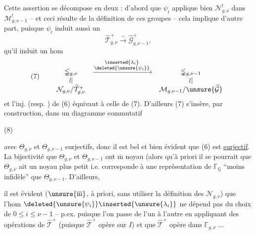 Cette assertion se décompose en deux :  d'abord que $\psi_i$ applique bien $\mathcal N_{g,\nu}^{!}$ dans $\mathcal M_{g,\nu-1}^{!}$ -- et ceci résulte de la définition  de ces groupes -- cela implique d'autre part, puisque $\psi_i$ induit aussi un  
\[
\widehat{\mathcal T}_{g,\nu}^{+}
\xrightarrow{\sim}
\widehat{\mathcal G}_{g,\nu-1}^{+},
\]
qu'il induit un hom
\[
(7)\qquad
\begin{array}{ccc}
\mathbb{\Gamma}_{g,\nu}
&\xrightarrow{\substack{\inserted{\lambda_i}\\\deleted{\unsure{\psi_i}}}}&
\mathbb{\Gamma}_{g,\nu-1}\\
\wr\vert&&\wr\vert\\
\mathcal N_{g,\nu}/\widehat{\mathcal T}_{g,\nu}^{+}
&&\mathcal M_{g,\nu-1}/\unsure{\widehat{\mathcal G}}
\end{array}
\]
et l'inj. (resp. ) de (6) équivaut à celle de (7). D'ailleurs (7) s'insère, par construction, dans un diagramme commutatif

\begin{samepage}
(8)\quad{}
\end{samepage}

avec $\Theta_{g,\nu}$ et $\Theta_{g,\nu-1}$ surjectifs, donc il est bel et bien évident que (6) est \uline{surjectif}. La bijectivité  que $\Theta_{g,\nu}$ et $\Theta_{g,\nu-1}$ ont $\overline{\mathrm m}$ noyau (alors qu'à priori il se pourrait que $\Theta_{g,\nu}$ ait un noyau plus petit i.e. corresponde à une représentation de $\mathbb{\Gamma}_{\mathbb Q}$ ``moins infidèle'' que $\Theta_{g,\nu-1}$. D'ailleurs,


il est évident  ($\unsure{\overline{\mathrm m}}$, à priori, sans utiliser la définition   des $\mathcal N_{g,\nu}$) que l'hom $\deleted{\unsure{\psi_i}}\inserted{\unsure{\lambda_i}}$  ne dépend pas du choix de $0\leq i\leq\nu-1$ -- p.ex. puisque l'on passe de l'un à l'autre en appliquant des opérations de $\widehat{\mathcal T}^{+}$ (puisque $\widehat{\mathcal T}^{+}$ opère  sur $I$) et que $\widehat{\mathcal T}^{+}$ opère  dans $\mathbb{\Gamma}_{g,\nu}$ ...

